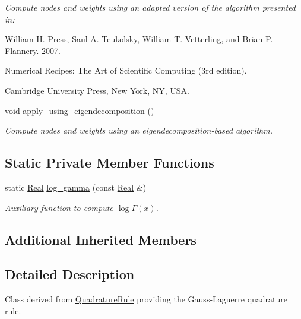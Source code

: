 \begin{DoxyCompactItemize}
\begin{DoxyCompactList}\small\item\em Compute nodes and weights using an adapted version of the algorithm presented in\-: \par
William H. Press, Saul A. Teukolsky, William T. Vetterling, and Brian P. Flannery. 2007. \par
Numerical Recipes\-: The Art of Scientific Computing (3rd edition). \par
Cambridge University Press, New York, N\-Y, U\-S\-A. \end{DoxyCompactList}\item 
\hypertarget{classGaussLaguerreRule_add3939f72a845e748c388220bb1ad934}{void \hyperlink{classGaussLaguerreRule_add3939f72a845e748c388220bb1ad934}{apply\-\_\-using\-\_\-eigendecomposition} ()}\label{classGaussLaguerreRule_add3939f72a845e748c388220bb1ad934}

\begin{DoxyCompactList}\small\item\em Compute nodes and weights using an eigendecomposition-\/based algorithm. \end{DoxyCompactList}\end{DoxyCompactItemize}
\subsection*{Static Private Member Functions}
\begin{DoxyCompactItemize}
\item 
static \hyperlink{typedefs_8h_a060b837c3b4486ee35317744156f3da2}{Real} \hyperlink{classGaussLaguerreRule_a0c297bfe019993090adc2df5aba866c7}{log\-\_\-gamma} (const \hyperlink{typedefs_8h_a060b837c3b4486ee35317744156f3da2}{Real} \&)
\begin{DoxyCompactList}\small\item\em Auxiliary function to compute $ \log\Gamma\left(x\right) $. \end{DoxyCompactList}\end{DoxyCompactItemize}
\subsection*{Additional Inherited Members}


\subsection{Detailed Description}
Class derived from \hyperlink{classQuadratureRule}{Quadrature\-Rule} providing the Gauss-\/\-Laguerre quadrature rule. 

